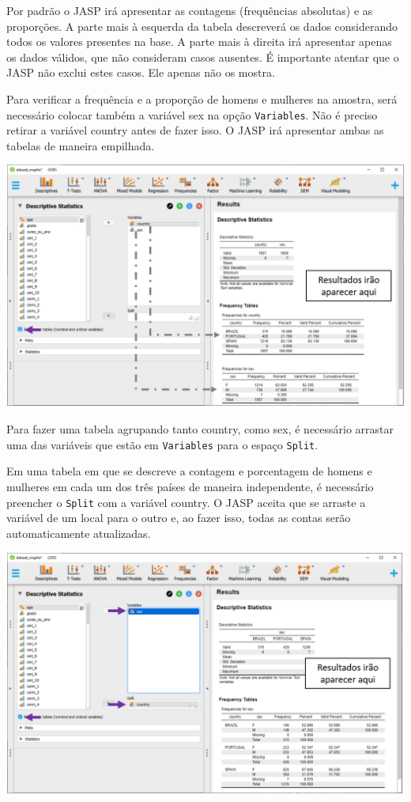 \documentclass[
]{book}
\begin{document}
Por padrão o JASP irá apresentar as contagens (frequências absolutas) e
as proporções. A parte mais à esquerda da tabela descreverá os dados
considerando todos os valores presentes na base. A parte mais à direita
irá apresentar apenas os dados válidos, que não consideram casos
ausentes. É importante atentar que o JASP não exclui estes casos. Ele
apenas não os mostra.

Para verificar a frequência e a proporção de homens e mulheres na
amostra, será necessário colocar também a variável sex na opção
\texttt{Variables}. Não é preciso retirar a variável country antes de
fazer isso. O JASP irá apresentar ambas as tabelas de maneira empilhada.

\includegraphics{./img/cap_desc_jasp_proporcao_duas_variaveis.png}

Para fazer uma tabela agrupando tanto country, como sex, é necessário
arrastar uma das variáveis que estão em \texttt{Variables} para o espaço
\texttt{Split}.

Em uma tabela em que se descreve a contagem e porcentagem de homens e
mulheres em cada um dos três países de maneira independente, é
necessário preencher o \texttt{Split} com a variável country. O JASP
aceita que se arraste a variável de um local para o outro e, ao fazer
isso, todas as contas serão automaticamente atualizadas.

\includegraphics{./img/cap_desc_jasp_proporcao_duas_variaveis_split.png}
\end{document}
